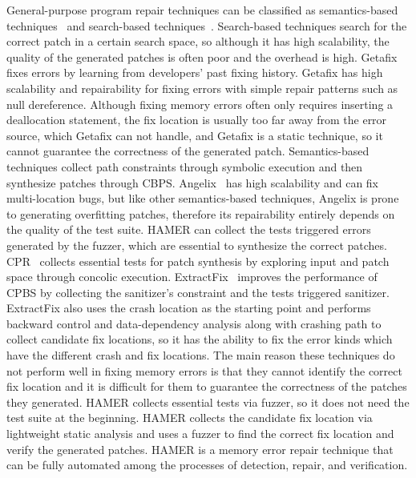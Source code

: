 \documentclass[a4paper,11pt,oneside,openany]{book}
\begin{document}
General-purpose program repair techniques can be classified as semantics-based techniques~\cite{jfix,semfix,directfix,Angelix,Extractfix,CPR,acs} and search-based techniques~\cite{par,s3, spr, prophet,cp}. Search-based techniques search for the correct patch in a certain search space, so although it has high scalability, the quality of the generated patches is often poor and the overhead is high. Getafix~\cite{Getafix} fixes errors by learning from developers' past fixing history. Getafix has high scalability and repairability for fixing errors with simple repair patterns such as null dereference. Although fixing memory errors often only requires inserting a deallocation statement, the fix location is usually too far away from the error source, which Getafix can not handle, and Getafix is a static technique, so it cannot guarantee the correctness of the generated patch. Semantics-based techniques collect path constraints through symbolic execution and then synthesize patches through CBPS. Angelix~\cite{Angelix} has high scalability and can fix multi-location bugs, but like other semantics-based techniques, Angelix is prone to generating overfitting patches, therefore its repairability entirely depends on the quality of the test suite. HAMER can collect the tests triggered errors generated by the fuzzer, which are essential to synthesize the correct patches. CPR~\cite{CPR} collects essential tests for patch synthesis by exploring input and patch space through concolic execution. ExtractFix~\cite{Extractfix} improves the performance of CPBS by collecting the sanitizer's constraint and the tests triggered sanitizer. ExtractFix also uses the crash location as the starting point and performs backward control and data-dependency analysis along with crashing path to collect candidate fix locations, so it has the ability to fix the error kinds which have the different crash and fix locations. The main reason these techniques do not perform well in fixing memory errors is that they cannot identify the correct fix location and it is difficult for them to guarantee the correctness of the patches they generated. HAMER collects essential tests via fuzzer, so it does not need the test suite at the beginning. HAMER collects the candidate fix location via lightweight static analysis and uses a fuzzer to find the correct fix location and verify the generated patches. HAMER is a memory error repair technique that can be fully automated among the processes of detection, repair, and verification. 
\end{document}
